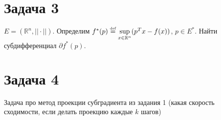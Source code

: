\documentclass[a4paper]{article}
\def\eqdef{\overset{\mbox{\tiny def}}{=}}
\begin{document}
\section*{Задача 3}
$E=(\mathbb{R}^n,||\cdot||)$. Определим $f^*(p)\eqdef\sup\limits_{x\in\mathbb{R}^n}(p^Tx-f(x))$, $p\in E^*$. Найти субдифференциал $\partial f^*(p)$.
\section*{Задача 4}
Задача про метод проекции субградиента из задания 1 (какая скорость сходимости, если делать проекцию каждые $k$ шагов)
\end{document}
